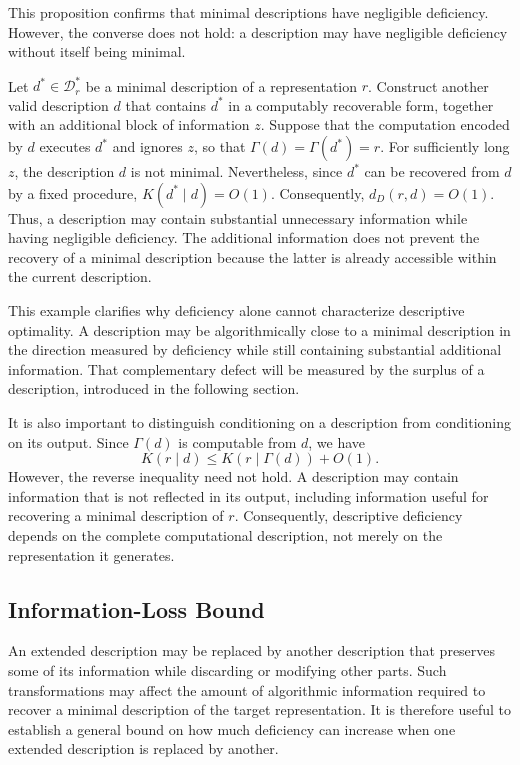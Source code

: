 This proposition confirms that minimal descriptions have negligible deficiency. However, the converse does not hold: a description may have negligible deficiency without itself being minimal.

\begin{example}
\label{ex:nonminimal_low_deficiency}
Let $d^\ast\in\mathcal D_r^\ast$ be a minimal description of a representation $r$. Construct another valid description $d$ that contains $d^\ast$ in a computably recoverable form, together with an additional block of information $z$. Suppose that the computation encoded by $d$ executes $d^\ast$ and ignores $z$, so that $\Gamma(d)=\Gamma(d^\ast)=r$. For sufficiently long $z$, the description $d$ is not minimal. Nevertheless, since $d^\ast$ can be recovered from $d$ by a fixed procedure, $K(d^\ast\mid d)=O(1)$. Consequently, $d_D(r,d)=O(1)$. Thus, a description may contain substantial unnecessary information while having negligible deficiency. The additional information does not prevent the recovery of a minimal description because the latter is already accessible within the current description.
\end{example}

This example clarifies why deficiency alone cannot characterize descriptive optimality. A description may be algorithmically close to a minimal description in the direction measured by deficiency while still containing substantial additional information. That complementary defect will be measured by the surplus of a description, introduced in the following section.

It is also important to distinguish conditioning on a description from conditioning on its output. Since $\Gamma(d)$ is computable from $d$, we have
\[
K(r\mid d)\le K(r\mid\Gamma(d))+O(1).
\]
However, the reverse inequality need not hold. A description may contain information that is not reflected in its output, including information useful for recovering a minimal description of $r$. Consequently, descriptive deficiency depends on the complete computational description, not merely on the representation it generates. 


\subsection*{Information-Loss Bound}

An extended description may be replaced by another description that preserves some of its information while discarding or modifying other parts. Such transformations may affect the amount of algorithmic information required to recover a minimal description of the target representation. It is therefore useful to establish a general bound on how much deficiency can increase when one extended description is replaced by another.

